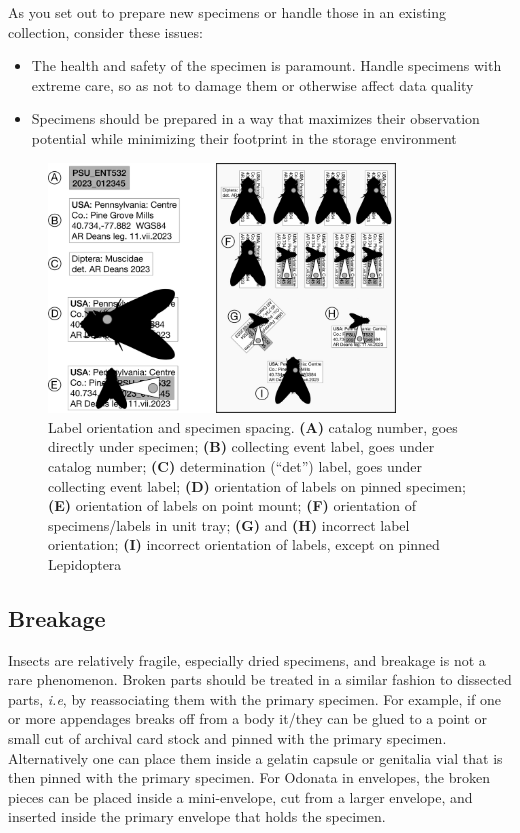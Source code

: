 \noindent{}As you set out to prepare new specimens or handle those in an existing collection, consider these issues:
\begin{itemize}
    \item The health and safety of the specimen is paramount. Handle specimens with extreme care, so as not to damage them or otherwise affect data quality
    \item Specimens should be prepared in a way that maximizes their observation potential while minimizing their footprint in the storage environment
\end{itemize}

\begin{figure}[ht!]
	\centering
  \includegraphics[width=0.82\textwidth]{sections/img/specimenPreps/specimenSpacing}
  \caption{Label orientation and specimen spacing. \textbf{(A)} catalog number, goes directly under specimen; \textbf{(B)} collecting event label, goes under catalog number; \textbf{(C)} determination (``det'') label, goes under collecting event label; \textbf{(D)} orientation of labels on pinned specimen; \textbf{(E)} orientation of labels on point mount; \textbf{(F)} orientation of specimens/labels in unit tray; \textbf{(G)} and \textbf{(H)} incorrect label orientation; \textbf{(I)} incorrect orientation of labels, except on pinned Lepidoptera}
  \label{fig:spacing}
\end{figure}

\subsection{Breakage}
Insects are relatively fragile, especially dried specimens, and breakage is not a rare phenomenon. Broken parts should be treated in a similar fashion to dissected parts, \textit{i.e}, by reassociating them with the primary specimen. For example, if one or more appendages breaks off from a body it/they can be glued to a point or small cut of archival card stock and pinned with the primary specimen. Alternatively one can place them inside a gelatin capsule or genitalia vial that is then pinned with the primary specimen. For Odonata in envelopes, the broken pieces can be placed inside a mini-envelope, cut from a larger envelope, and inserted inside the primary envelope that holds the specimen.

